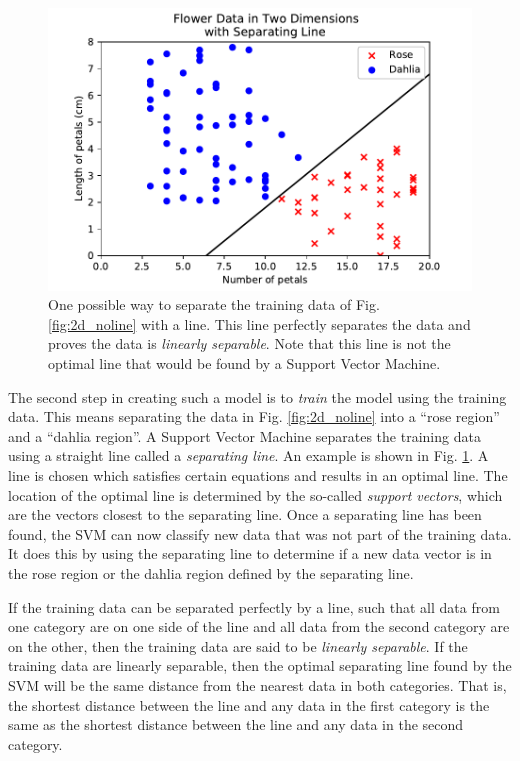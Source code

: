 \documentclass[%
 reprint,
nofootinbib,
 amsmath,amssymb,
 aps,
]{revtex4-2}
\begin{document}
\begin{figure}
    \includegraphics[width=\linewidth]{Figures/2d_line.pdf}
    \caption{\label{fig:2d_line}One possible way to separate the training data of Fig. \ref{fig:2d_noline} with a line. This line perfectly separates the data and proves the data is \textit{linearly separable}. Note that this line is not the optimal line that would be found by a Support Vector Machine.}
\end{figure}

The second step in creating such a model is to \textit{train} the model using the training data. This means separating the data in Fig. \ref{fig:2d_noline} into a ``rose region'' and a ``dahlia region''. 
A Support Vector Machine separates the training data using a straight line called a \textit{separating line}. An example is shown in Fig. \ref{fig:2d_line}. A line is chosen which satisfies certain equations and results in an optimal line. The location of the optimal line is determined by the so-called \textit{support vectors}, which are the vectors closest to the separating line. Once a separating line has been found, the SVM can now classify new data that was not part of the training data. It does this by using the separating line to determine if a new data vector is in the rose region or the dahlia region defined by the separating line.

If the training data can be separated perfectly by a line, such that all data from one category are on one side of the line and all data from the second category are on the other, then the training data are said to be \textit{linearly separable}. If the training data are linearly separable, then the optimal separating line found by the SVM will be the same distance from the nearest data in both categories. That is, the shortest distance between the line and any data in the first category is the same as the shortest distance between the line and any data in the second category.
\end{document}
